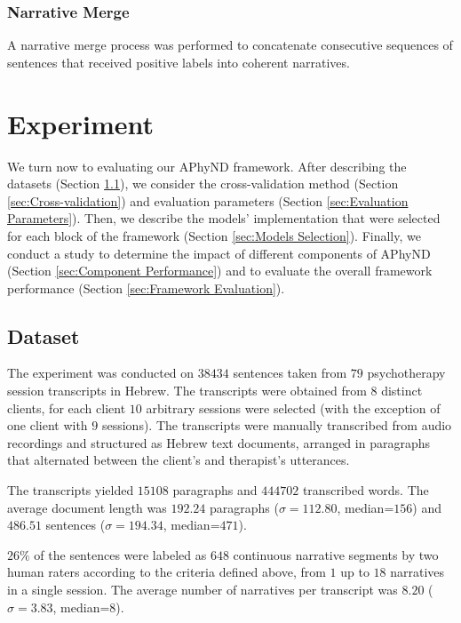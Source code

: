 \documentclass[preprint,12pt]{elsarticle}
\begin{document}
\subsubsection{Narrative Merge}

A narrative merge process was performed to concatenate consecutive sequences of sentences that received positive labels into coherent narratives.

\section{Experiment}

We turn now to evaluating our APhyND framework. After describing the datasets (Section \ref{sec:Dataset}), we consider the cross-validation method (Section \ref{sec:Cross-validation}) and evaluation parameters (Section \ref{sec:Evaluation Parameters}). Then, we describe the models' implementation that were selected for each block of the framework (Section \ref{sec:Models Selection}). Finally, we conduct a study to determine the impact of different components of APhyND (Section \ref{sec:Component Performance}) and to evaluate the overall framework performance (Section \ref{sec:Framework Evaluation}).

\subsection{Dataset} \label{sec:Dataset}

The experiment was conducted on $38434$ sentences taken from $79$ psychotherapy session transcripts in Hebrew. The transcripts were obtained from $8$ distinct clients, for each client $10$ arbitrary sessions were selected (with the exception of one client with $9$ sessions). The transcripts were manually transcribed from audio recordings and structured as Hebrew text documents, arranged in paragraphs that alternated between the client's and therapist's utterances.

The transcripts yielded  $15108$ paragraphs and  $444702$ transcribed words. The average document length was $192.24$ paragraphs ($\sigma=112.80$, median=$156$) and $486.51$ sentences ($\sigma=194.34$, median=$471$).

$26\%$ of the sentences were labeled as $648$ continuous narrative segments by two human raters according to the criteria defined above, from $1$ up to $18$ narratives in a single session. The average number of narratives per transcript was $8.20$ ($\sigma=3.83$, median=$8$). 
\end{document}
